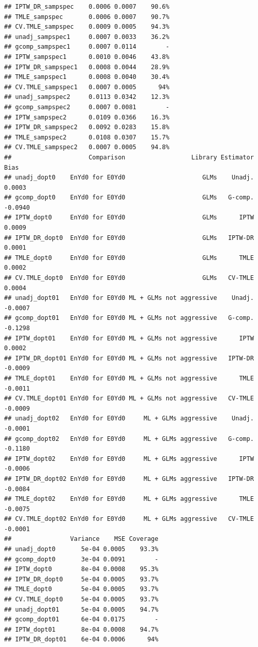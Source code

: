 \documentclass[11pt]{article}\usepackage[]{graphicx}\usepackage[]{color}
\makeatletter
\newenvironment{kframe}{%
 \def\at@end@of@kframe{}%
 \ifinner\ifhmode%
  \def\at@end@of@kframe{\end{minipage}}%
  \begin{minipage}{\columnwidth}%
 \fi\fi%
 \def\FrameCommand##1{\hskip\@totalleftmargin \hskip-\fboxsep
 \colorbox{shadecolor}{##1}\hskip-\fboxsep
     \hskip-\linewidth \hskip-\@totalleftmargin \hskip\columnwidth}%
 \MakeFramed {\advance\hsize-\width
   \@totalleftmargin\z@ \linewidth\hsize
   \@setminipage}}%
 {\par\unskip\endMakeFramed%
 \at@end@of@kframe}
\newenvironment{knitrout}{}{} %
\makeatother
\begin{document}
\begin{knitrout}
\begin{kframe}
\begin{verbatim}
## IPTW_DR_sampspec    0.0006 0.0007    90.6%
## TMLE_sampspec       0.0006 0.0007    90.7%
## CV.TMLE_sampspec    0.0009 0.0005    94.3%
## unadj_sampspec1     0.0007 0.0033    36.2%
## gcomp_sampspec1     0.0007 0.0114        -
## IPTW_sampspec1      0.0010 0.0046    43.8%
## IPTW_DR_sampspec1   0.0008 0.0044    28.9%
## TMLE_sampspec1      0.0008 0.0040    30.4%
## CV.TMLE_sampspec1   0.0007 0.0005      94%
## unadj_sampspec2     0.0113 0.0342    12.3%
## gcomp_sampspec2     0.0007 0.0081        -
## IPTW_sampspec2      0.0109 0.0366    16.3%
## IPTW_DR_sampspec2   0.0092 0.0283    15.8%
## TMLE_sampspec2      0.0108 0.0307    15.7%
## CV.TMLE_sampspec2   0.0007 0.0005    94.8%
##                     Comparison                  Library Estimator    Bias
## unadj_dopt0    EnYd0 for E0Yd0                     GLMs    Unadj.  0.0003
## gcomp_dopt0    EnYd0 for E0Yd0                     GLMs   G-comp. -0.0940
## IPTW_dopt0     EnYd0 for E0Yd0                     GLMs      IPTW  0.0009
## IPTW_DR_dopt0  EnYd0 for E0Yd0                     GLMs   IPTW-DR  0.0001
## TMLE_dopt0     EnYd0 for E0Yd0                     GLMs      TMLE  0.0002
## CV.TMLE_dopt0  EnYd0 for E0Yd0                     GLMs   CV-TMLE  0.0004
## unadj_dopt01   EnYd0 for E0Yd0 ML + GLMs not aggressive    Unadj. -0.0007
## gcomp_dopt01   EnYd0 for E0Yd0 ML + GLMs not aggressive   G-comp. -0.1298
## IPTW_dopt01    EnYd0 for E0Yd0 ML + GLMs not aggressive      IPTW  0.0002
## IPTW_DR_dopt01 EnYd0 for E0Yd0 ML + GLMs not aggressive   IPTW-DR -0.0009
## TMLE_dopt01    EnYd0 for E0Yd0 ML + GLMs not aggressive      TMLE -0.0011
## CV.TMLE_dopt01 EnYd0 for E0Yd0 ML + GLMs not aggressive   CV-TMLE -0.0009
## unadj_dopt02   EnYd0 for E0Yd0     ML + GLMs aggressive    Unadj. -0.0001
## gcomp_dopt02   EnYd0 for E0Yd0     ML + GLMs aggressive   G-comp. -0.1180
## IPTW_dopt02    EnYd0 for E0Yd0     ML + GLMs aggressive      IPTW -0.0006
## IPTW_DR_dopt02 EnYd0 for E0Yd0     ML + GLMs aggressive   IPTW-DR -0.0084
## TMLE_dopt02    EnYd0 for E0Yd0     ML + GLMs aggressive      TMLE -0.0075
## CV.TMLE_dopt02 EnYd0 for E0Yd0     ML + GLMs aggressive   CV-TMLE -0.0001
##                Variance    MSE Coverage
## unadj_dopt0       5e-04 0.0005    93.3%
## gcomp_dopt0       3e-04 0.0091        -
## IPTW_dopt0        8e-04 0.0008    95.3%
## IPTW_DR_dopt0     5e-04 0.0005    93.7%
## TMLE_dopt0        5e-04 0.0005    93.7%
## CV.TMLE_dopt0     5e-04 0.0005    93.7%
## unadj_dopt01      5e-04 0.0005    94.7%
## gcomp_dopt01      6e-04 0.0175        -
## IPTW_dopt01       8e-04 0.0008    94.7%
## IPTW_DR_dopt01    6e-04 0.0006      94%

\end{verbatim}
\end{kframe}
\end{knitrout}
\end{document}
